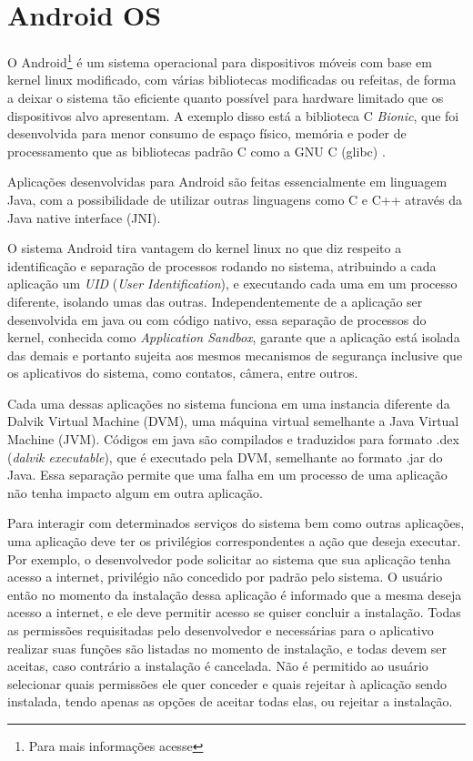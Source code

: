 \chapter{Android OS}
\label{cap:android-os}

O Android\footnote{Para mais informações acesse } é um sistema operacional para dispositivos móveis com base em kernel linux modificado, com várias bibliotecas modificadas ou refeitas, de forma a deixar o sistema tão eficiente quanto possível para hardware limitado que os dispositivos alvo apresentam. A exemplo disso está a biblioteca C \textit{Bionic}, que foi desenvolvida para menor consumo de espaço físico, memória e poder de processamento que as bibliotecas padrão C como a GNU C (glibc) \cite{devos2014}. 

Aplicações desenvolvidas para Android são feitas essencialmente em linguagem Java, com a possibilidade de utilizar outras linguagens como C e C++ através da Java native interface (JNI). 

O sistema Android tira vantagem do kernel linux no que diz respeito a identificação e separação de processos rodando no sistema, atribuindo a cada aplicação um \textit{UID} (\textit{User Identification}), e executando cada uma em um processo diferente, isolando umas das outras.  Independentemente de a aplicação ser desenvolvida em java ou com código nativo, essa separação de processos do kernel, conhecida como \textit{Application Sandbox}, garante que a aplicação está isolada das demais e portanto sujeita aos mesmos mecanismos de segurança inclusive que os aplicativos do sistema, como contatos, câmera, entre outros. 

Cada uma dessas aplicações no sistema funciona em uma instancia diferente da Dalvik Virtual Machine (DVM), uma máquina virtual semelhante a Java Virtual Machine (JVM). Códigos em java são compilados e traduzidos para formato .dex (\textit{dalvik executable}), que é executado pela DVM, semelhante ao formato .jar do Java. Essa separação permite que uma falha em um processo de uma aplicação não tenha impacto algum em outra aplicação. 

Para interagir com determinados serviços do sistema bem como outras aplicações, uma aplicação deve ter os privilégios correspondentes a ação que deseja executar. Por exemplo, o desenvolvedor pode solicitar ao sistema que sua aplicação tenha acesso a internet, privilégio não concedido por padrão pelo sistema. O usuário então no momento da instalação dessa aplicação é informado que a mesma deseja acesso a internet, e ele deve permitir acesso se quiser concluir a instalação. Todas as permissões requisitadas pelo desenvolvedor e necessárias para o aplicativo realizar suas funções são listadas no momento de instalação, e todas devem ser aceitas, caso contrário a instalação é cancelada. Não é permitido ao usuário selecionar quais permissões ele quer conceder e quais rejeitar à aplicação sendo instalada, tendo apenas as opções de aceitar todas elas, ou rejeitar a instalação. 

